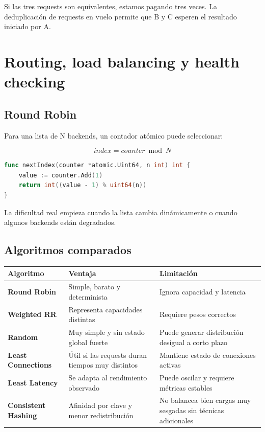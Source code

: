 \documentclass[11pt,a4paper]{article}
\begin{document}
Si las tres requests son equivalentes, estamos pagando tres veces. La deduplicación de requests en vuelo permite que B y C esperen el resultado iniciado por A.

\section{Routing, load balancing y health checking}

\subsection{Round Robin}

Para una lista de N backends, un contador atómico puede seleccionar:

\[
index = counter \bmod N
\]

\begin{lstlisting}[language=Go,caption={Índice Round Robin con atomic}]
func nextIndex(counter *atomic.Uint64, n int) int {
    value := counter.Add(1)
    return int((value - 1) % uint64(n))
}
\end{lstlisting}

La dificultad real empieza cuando la lista cambia dinámicamente o cuando algunos backends están degradados.

\subsection{Algoritmos comparados}

\begin{table}[h]
\centering
\small
\begin{tabularx}{\textwidth}{>{\bfseries}p{3.4cm} X X}
\toprule
Algoritmo & Ventaja & Limitación \\
\midrule
Round Robin & Simple, barato y determinista & Ignora capacidad y latencia \\
Weighted RR & Representa capacidades distintas & Requiere pesos correctos \\
Random & Muy simple y sin estado global fuerte & Puede generar distribución desigual a corto plazo \\
Least Connections & Útil si las requests duran tiempos muy distintos & Mantiene estado de conexiones activas \\
Least Latency & Se adapta al rendimiento observado & Puede oscilar y requiere métricas estables \\
Consistent Hashing & Afinidad por clave y menor redistribución & No balancea bien cargas muy sesgadas sin técnicas adicionales \\
\bottomrule
\end{tabularx}
\end{table}
\end{document}
